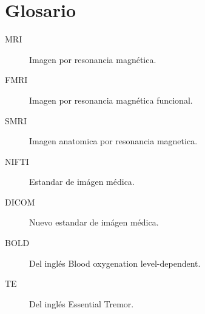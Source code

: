 
\chapter{Glosario}
\begin{description}
\item[MRI] Imagen por resonancia magnética. \label{glos:mri}
\item[FMRI] Imagen por resonancia magnética funcional. \label{glos:fmri}
\item[SMRI] Imagen anatomica por resonancia magnetica. \label{glos:smri}
\item[NIFTI] Estandar de imágen médica. \label{glos:nifti}
\item[DICOM] Nuevo estandar de imágen médica. \label{glos:dicom}
\item[BOLD] Del inglés Blood oxygenation level-dependent. \label{glos:bold}
\item[TE] Del inglés Essential Tremor. \label{glos:et}
\end{description}